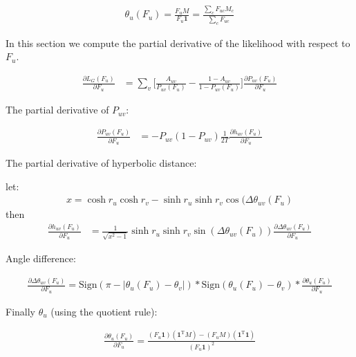 \documentclass{article}
\begin{document}
	\begin{align}
	\theta_u(F_u) = \frac{F_u M}{F_u \textbf{1}} = \frac{\sum_c F_{uc} M_c}{\sum_c F_{uc}}	
	\end{align}
	
	\hrulefill
	
	\pagebreak
	
	In this section we compute the partial derivative of the likelihood with respect to $F_u$.
	
	\begin{align}
	\frac{\partial L_G(F_u)}{\partial F_u} &= \sum_{v} \bigg[\frac{A_{uv}}{P_{uv}(F_u)} - \frac{1 - A_{uv}}{1 - P_{uv}(F_u)}\bigg] \frac{\partial P_{uv}(F_u)}{\partial F_u}
	\end{align}
	
	The partial derivative of $P_{uv}$:
	
	\begin{align}
	\frac{\partial P_{uv}(F_u)}{\partial F_u} &= - P_{uv} (1-P_{uv}) \frac{1}{2T} \frac{\partial h_{uv}(F_u)}{\partial F_u} 
	\end{align}
	
	The partial derivative of hyperbolic distance:
	
	let:
	\begin{align}
	x = \cosh r_u \cosh r_v - \sinh r_u \sinh r_v \cos(\Delta \theta_{uv}(F_u)
	\end{align}
	then
	\begin{align}
	\frac{\partial h_{uv}(F_u)}{\partial F_u} &= \frac{1}{\sqrt{x^2 - 1}} \sinh r_u \sinh r_v \sin(\Delta \theta_{uv}(F_u)) \frac{\partial \Delta \theta_{uv}(F_u)}{\partial F_u} 
	\end{align}
	
	Angle difference:
	
	\begin{align}
	\frac{\partial \Delta \theta_{uv}(F_u)}{\partial F_u} = \text{Sign}(\pi - |\theta_u(F_u) - \theta_v|) * \text{Sign}(\theta_u(F_u) - \theta_v) *  \frac{\partial \theta_u(F_u)} {\partial F_u}
	\end{align}
	
	Finally $\theta_u$ (using the quotient rule):
	
	\begin{align}
	\frac{\partial \theta_u(F_u)}{\partial F_u} = \frac{(F_u \textbf{1})(\textbf{1}^{\text{T}} M) - (F_u M)(\textbf{1}^{\text{T}} \textbf{1})}{(F_u \textbf{1})^2}
	\end{align}
	
	\hrulefill
	
\end{document}
